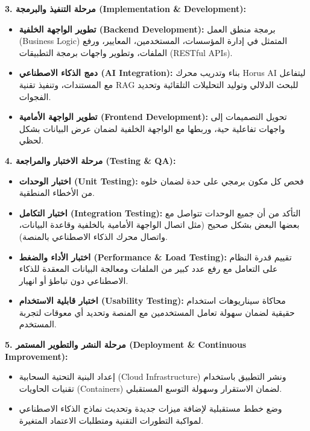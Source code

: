 \documentclass[12pt, a4paper]{report}
\begin{document}
\begin{english}
\textbf{3. مرحلة التنفيذ والبرمجة (Implementation & Development):} \\
\begin{itemize}
\item \textbf{تطوير الواجهة الخلفية (Backend Development):} برمجة منطق العمل (Business Logic) المتمثل في إدارة المؤسسات، المستخدمين، المعايير، ورفع الملفات، وتطوير واجهات برمجة التطبيقات (RESTful APIs).
\item \textbf{دمج الذكاء الاصطناعي (AI Integration):} بناء وتدريب محرك Horus AI ليتفاعل مع المستندات، وتنفيذ تقنية RAG للبحث الدلالي وتوليد التحليلات التلقائية وتحديد الفجوات.
\item \textbf{تطوير الواجهة الأمامية (Frontend Development):} تحويل التصميمات إلى واجهات تفاعلية حية، وربطها مع الواجهة الخلفية لضمان عرض البيانات بشكل لحظي.
\end{itemize}

\textbf{4. مرحلة الاختبار والمراجعة (Testing & QA):} \\
\begin{itemize}
\item \textbf{اختبار الوحدات (Unit Testing):} فحص كل مكون برمجي على حدة لضمان خلوه من الأخطاء المنطقية.
\item \textbf{اختبار التكامل (Integration Testing):} التأكد من أن جميع الوحدات تتواصل مع بعضها البعض بشكل صحيح (مثل اتصال الواجهة الأمامية بالخلفية وقاعدة البيانات، واتصال محرك الذكاء الاصطناعي بالمنصة).
\item \textbf{اختبار الأداء والضغط (Performance & Load Testing):} تقييم قدرة النظام على التعامل مع رفع عدد كبير من الملفات ومعالجة البيانات المعقدة للذكاء الاصطناعي دون تباطؤ أو انهيار.
\item \textbf{اختبار قابلية الاستخدام (Usability Testing):} محاكاة سيناريوهات استخدام حقيقية لضمان سهولة تعامل المستخدمين مع المنصة وتحديد أي معوقات لتجربة المستخدم.
\end{itemize}

\textbf{5. مرحلة النشر والتطوير المستمر (Deployment & Continuous Improvement):} \\
\begin{itemize}
\item إعداد البنية التحتية السحابية (Cloud Infrastructure) ونشر التطبيق باستخدام تقنيات الحاويات (Containers) لضمان الاستقرار وسهولة التوسع المستقبلي.
\item وضع خطط مستقبلية لإضافة ميزات جديدة وتحديث نماذج الذكاء الاصطناعي لمواكبة التطورات التقنية ومتطلبات الاعتماد المتغيرة.
\end{itemize}


\end{english}
\end{document}

